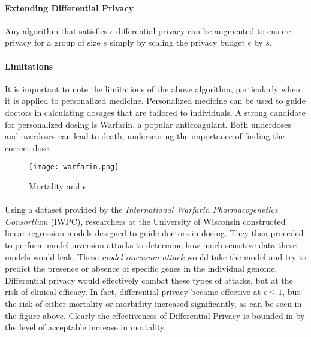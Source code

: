 \paragraph{Extending Differential Privacy}
Any algorithm that satisfies $\epsilon$-differential privacy can be augmented to ensure privacy for a group of size $s$ simply by scaling the privacy budget $\epsilon$ by $s$.

\paragraph{Limitations}

It is important to note the limitations of the above algorithm, particularly when it is applied to personalized medicine. Personalized medicine can be used to guide doctors in calculating dosages that are tailored to individuals. A strong candidate for personalized dosing is Warfarin, a popular anticoagulant. Both underdoses and overdoses can lead to death, underscoring the importance of finding the correct dose.

\begin{center}
\begin{figure}[t!]
\texttt{[image: warfarin.png]}
\centering
\caption{Mortality and $\epsilon$}
\end{figure}
\end{center}

\paragraph{}
Using a dataset provided by the \textit{International Warfarin Pharmacogenetics Consortium} (IWPC), researchers at the University of Wisconsin constructed linear regression models designed to guide doctors in dosing. They then proceded to perform model inversion attacks to determine how much sensitive data these models would leak. These \textit{model inversion attack} would take the model and try to predict the presence or absence of specific genes in the individual genome.\cite{warfarin} Differential privacy would effectively combat these types of attacks, but at the risk of clinical efficacy. In fact, differential privacy became effective at $\epsilon \leq 1$, but the risk of either mortality or morbidity increased significantly, as can be seen in the figure above. Clearly the effectiveness of Differential Privacy is bounded in by the level of acceptable increase in mortality.

